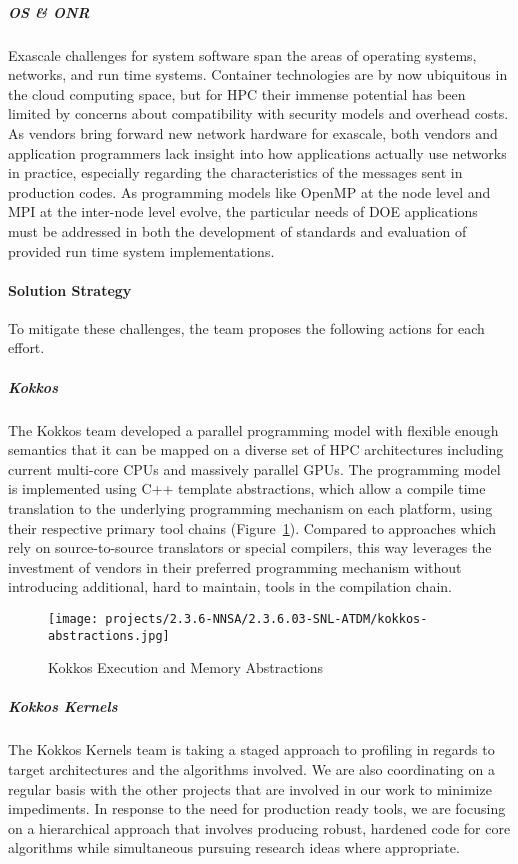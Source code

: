 \subparagraph{OS \& ONR} Exascale challenges for system software span the areas of operating systems, networks, and run time systems.  Container technologies are by now ubiquitous in the cloud computing space, but for HPC their immense potential has been limited by concerns about compatibility with security models and overhead costs.  As vendors bring forward new network hardware for exascale, both vendors and application programmers lack insight into how applications actually use networks in practice, especially regarding the characteristics of the messages sent in production codes.  As programming models like OpenMP at the node level and MPI at the inter-node level evolve, the particular needs of DOE applications must be addressed in both the development of standards and evaluation of provided run time system implementations.



\paragraph{Solution Strategy} %
To mitigate these challenges, the team proposes the following actions for each effort.

\subparagraph{Kokkos} The Kokkos team developed a parallel programming model with flexible enough semantics that it can be mapped on a diverse set of HPC architectures including current multi-core CPUs and massively parallel GPUs.
The programming model is implemented using C++ template abstractions, which allow a compile time translation to the underlying programming mechanism on each platform, using their respective primary tool chains (Figure~\ref{figure:kokkos-abstractions}).
Compared to approaches which rely on source-to-source translators or special compilers, this way leverages the investment of vendors in their preferred programming mechanism without introducing additional, hard to maintain, tools in the compilation chain.

\begin{figure}[ht!]
\centering
\texttt{[image: projects/2.3.6-NNSA/2.3.6.03-SNL-ATDM/kokkos-abstractions.jpg]}
\caption{Kokkos Execution and Memory Abstractions}
\label{figure:kokkos-abstractions}
\end{figure}

\subparagraph{Kokkos Kernels} The Kokkos Kernels team is taking a staged approach to profiling in regards to target architectures and the algorithms involved. We are also coordinating on a regular basis with the other projects that are involved in our work to minimize impediments. In response to the need for production ready tools, we are focusing on a hierarchical approach that involves producing robust, hardened code for core algorithms while simultaneous pursuing research ideas where appropriate. 
 
